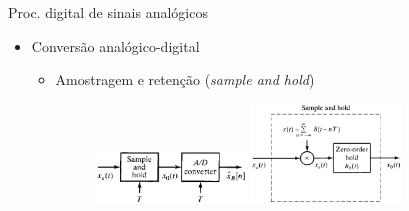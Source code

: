 
\begin{slide}{Proc. digital de sinais anal\'ogicos}
\begin{itemize}
   \item Conversão analógico-digital
   \begin{itemize}
      \item Amostragem e retenção (\emph{sample and hold})
      \begin{figure}
         \centering
          \includegraphics[width = 0.4\textwidth]{figs/ad_conv1.eps}
          \includegraphics[width = 0.4\textwidth]{figs/ad_conv2.eps}
      \end{figure}

   \end{itemize}
\end{itemize}
\end{slide}

